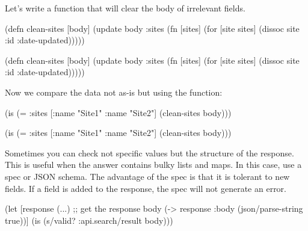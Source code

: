 \noindent
Let's write a function that will clear the body of irrelevant fields.

\ifnarrow

\begin{english}
  \begin{clojure}
(defn clean-sites [body]
 (update body :sites
  (fn [sites]
   (for [site sites]
    (dissoc site :id :date-updated)))))
  \end{clojure}
\end{english}

\else

\begin{english}
  \begin{clojure}
(defn clean-sites [body]
  (update body :sites
          (fn [sites]
            (for [site sites]
              (dissoc site :id :date-updated)))))
  \end{clojure}
\end{english}

\fi

\noindent
Now we compare the data not as-is but using the function:

\ifnarrow

\begin{english}
  \begin{clojure}
(is (= {:sites [{:name "Site1"}
                {:name "Site2"}]}
       (clean-sites body)))
  \end{clojure}
\end{english}

\else

\begin{english}
  \begin{clojure}
(is (= {:sites [{:name "Site1"} {:name "Site2"}]}
       (clean-sites body)))
  \end{clojure}
\end{english}

\fi

Sometimes you can check not specific values but the structure of the response. This is useful when the answer contains bulky lists and maps. In this case, use a spec or JSON schema. The advantage of the spec is that it is tolerant to new fields. If a field is added to the response, the spec will not generate an error.


\ifnarrow

\begin{english}
  \begin{clojure}
(let [response (...) ;; get the response
      body (-> response
               :body
               (json/parse-string
                 true))]
  (is (s/valid? :api.search/result
                body)))
  \end{clojure}
\end{english}

